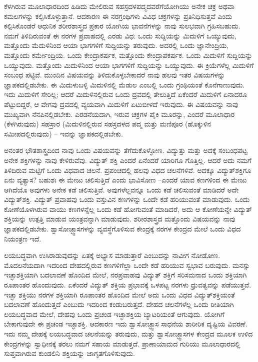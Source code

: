 ಕೆಳಗಿರುವ ಮೂಲಾಧಾರದಿಂದ ಹಿಡಿದು ಮೇಲಿರುವ ಸಹಸ್ರದಳಪದ್ಮದವರೆಗೆ\break ಯೋಗಿಯು ಅನೇಕ ಚಕ್ರ ಅಥವಾ ಕಮಲಗಳನ್ನು ಕಲ್ಪಿಸಿಕೊಳ್ಳುತ್ತಾನೆ. ಆದಕಾರಣ ಈ ನರಗ್ರಂಥಿಗಳು ವಿವಿಧ ಚಕ್ರಗಳನ್ನು ಪ್ರತಿನಿಧಿಸುತ್ತವೆ ಎಂದು ಕಲ್ಪಿಸಿಕೊಂಡರೆ ಆಧುನಿಕ ಶರೀರಶಾಸ್ತ್ರದ ಪ್ರಕಾರ ಯೋಗಿಯ ಭಾವನೆಗಳನ್ನು ನಾವು ಸುಲಭವಾಗಿ ಗ್ರಹಿಸಬಹುದು. ನಮಗೆ ತಿಳಿದಿರುವಂತೆ ಈ ನರಗಳ ಪ್ರವಾಹದಲ್ಲಿ ಎರಡು ವಿಧ: ಒಂದು ಸುದ್ದಿಯನ್ನು ಮಿದುಳಿಗೆ ಒಯ್ಯುವುದು, ಮತ್ತೊಂದು ಮೆದುಳಿನಿಂದ ಆಯಾ ಭಾಗಗಳಿಗೆ ಸುದ್ದಿಯನ್ನು ತರುವುದು. ಅದರಲ್ಲಿ ಒಂದು ಜ್ಞಾನೇಂದ್ರಿಯ, ಮತ್ತೊಂದು ಕರ್ಮೇಂದ್ರಿಯ. ಒಂದು ಕೇಂದ್ರಾಕರ್ಷಕ, ಮತ್ತೊಂದು ಕೇಂದ್ರಾಪಕರ್ಷಕ. ಒಂದು ಮಿದುಳಿಗೆ ಸುದ್ದಿಯನ್ನು ಒಯ್ಯುವುದು. ಮತ್ತೊಂದು ಮಿದುಳಿನಿಂದ ಆಯಾ ಭಾಗಗಳಿಗೆ ಸುದ್ದಿಯನ್ನು ಒಯ್ಯುವುದು. ಈ ಕ್ರಿಯೆಗಳೆಲ್ಲ ಮಿದುಳಿಗೆ ಸಂಬಂಧ ಪಟ್ಟಿವೆ. ಮುಂದಿನ ವಿಷಯವನ್ನು ತಿಳಿದುಕೊಳ್ಳಬೇಕಾದರೆ ನಾವು ಹಲವು ಇತರ ವಿಷಯಗಳನ್ನು ಜ್ಞಾಪಕದಲ್ಲಿಡಬೇಕು. ಈ ಮಿದುಳುಬಳ್ಳಿ ಮಿದುಳಿನಲ್ಲಿ ಮೆಡುಲ  ಎಂಬಲ್ಲಿ ಒಂದು ಗ್ರಂಥಿಯಂತೆ ಕೊನೆಗಾಣುವುದು. ಇದು ಮಿದುಳಿಗೆ ಸೇರಿಲ್ಲ; ಆದರೆ ಮಿದುಳಿನಲ್ಲಿರುವ ಒಂದು ದ್ರವದಲ್ಲಿ ತೇಲುತ್ತಿದೆ ಏಕೆಂದರೆ ಮಿದುಳಿಗೆ ಏನಾದರೂ ಪೆಟ್ಟುಬಿದ್ದರೆ, ಆ ವೇಗವು ದ್ರವದಲ್ಲಿ ವ್ಯಯವಾಗಿ ಮಿದುಳಿಗೆ ಏಟುಬೀಳದೆ ಇರುವುದು. ಈ ವಿಷಯವನ್ನು ನಾವು ಮುಖ್ಯವಾಗಿ ನೆನಪಿನಲ್ಲಿಡಬೇಕು. ಎರಡನೆಯದಾಗಿ, ಇರುವ ಚಕ್ರಗಳ ಪೈಕಿ ಮೂರನ್ನು, ಎಂದರೆ ಮೂಲಾಧಾರ (ಕೆಳಗಿರುವುದು) ಸಹಸ್ರಾರ (ಮಿದುಳಿನಲ್ಲಿರುವ ಸಹಸ್ರದಳದ ಪದ್ಮ ಮತ್ತು ಮಣಿಪೂರ (ಹೊಕ್ಕುಳಿನ ಸಮೀಪದಲ್ಲಿರುವುದು) – ಇವನ್ನು ಜ್ಞಾಪಕದಲ್ಲಿಡಬೇಕು. 



ಅನಂತರ ಭೌತಶಾಸ್ತ್ರದಿಂದ ನಾವು ಒಂದು ವಿಷಯವನ್ನು ತೆಗೆದುಕೊಳ್ಳೋಣ. ವಿದ್ಯುತ್ತು ಮತ್ತು ಅದಕ್ಕೆ ಸಂಬಂಧಪಟ್ಟ ಅನೇಕ ಶಕ್ತಿಗಳನ್ನು ನಾವು ಕೇಳಿರುವೆವು. ವಿದ್ಯುತ್​ ಶಕ್ತಿ ಎಂದರೆ ಏನೆಂದರೆ ಯಾರಿಗೂ ಗೊತ್ತಿಲ್ಲ. ಆದರೆ ಅದು ನಮಗೆ ತಿಳಿದಿರುವ ಮಟ್ಟಿಗೆ ಒಂದು ವಿಧವಾದ ಚಲನೆ. ಪ್ರಪಂಚದಲ್ಲಿ ಹಲವು ವಿಧದ ಚಲನೆಗಳಿವೆ. ಅದಕ್ಕೂ ವಿದ್ಯುತ್​ಶಕ್ತಿಗೂ ಏನು ವ್ಯತ್ಯಾಸ? ಬಹುಶಃ ಈ ಮೇಜು ಚಲಿಸುತ್ತಿದೆ ಎಂದು ಭಾವಿಸೋಣ –ಎಂದರೆ ಯಾವ ಕಣಗಳಿಂದ ಈ ಮೇಜು ಆಗಿದೆಯೊ ಅವುಗಳು ಅನೇಕ ಕಡೆ ಚಲಿಸುತ್ತಿವೆ. ಅವುಗಳೆಲ್ಲವನ್ನೂ ಒಂದು ಕಡೆ ಚಲಿಸುವಂತೆ ಮಾಡಿದರೆ ಅದೇ ವಿದ್ಯುತ್​ಶಕ್ತಿ. ವಿದ್ಯುತ್​ ಪ್ರವಾಹವು ಒಂದು ವಸ್ತುವಿನ ಕಣಗಳನ್ನು ಒಂದೇ ಕಡೆ ಹರಿಯುವಂತೆ ಮಾಡುವುದು. ಒಂದು ಕೋಣೆಯೊಳಗಿರುವ ವಾಯು ಕಣಗಳನ್ನೆಲ್ಲ ಒಂದು ಕಡೆ ಹೋಗುವಂತೆ ಮಾಡಿದರೆ, ಅದು ಆ ಕೋಣೆಯನ್ನೇ ವಿದ್ಯುತ್​ ಶಕ್ತಿಯನ್ನು ಉತ್ಪತ್ತಿ ಮಾಡುವ ಯಂತ್ರವನ್ನಾಗಿ ಮಾಡುವುದು. ಶರೀರಶಾಸ್ತ್ರದ ಮತ್ತೊಂದು ವಿಷಯವನ್ನು ನಾವು ಜ್ಞಾಪಕದಲ್ಲಿಡಬೇಕು. ಶ್ವಾಸೋಚ್ಛ್ವಾಸಗಳನ್ನು ವ್ಯವಸ್ಥೆಗೊಳಿಸುವ ಕೇಂದ್ರಕ್ಕೆ ನರಗಳ ಕೇಂದ್ರದ ಮೇಲೆ ಒಂದು ವಿಧದ ನಿಯಂತ್ರಣ ಇದೆ. 



ಲಯಬದ್ಧವಾಗಿ ಉಸಿರಾಡುವುದನ್ನು ಏತಕ್ಕೆ ಅಭ್ಯಾಸ ಮಾಡುತ್ತಾರೆ ಎಂಬುದನ್ನು ನಾವೀಗ ನೋಡೋಣ. ಮೊದಲನೆಯದಾಗಿ ಇದರಿಂದ ದೇಹದಲ್ಲಿರುವ ಕಣಗಳಿಗೆಲ್ಲಾ ಒಂದೇ ಕಡೆ ಹರಿಯುವ ಸ್ವಭಾವ ಬರುವುದು. ಮನಸ್ಸು ಇಚ್ಛಾಶಕ್ತಿಯಾಗಿ ಬದಲಾವಣೆ ಹೊಂದಿದ ಮೇಲೆ, ನರಪ್ರವಾಹವು ವಿದ್ಯುತ್​ ಶಕ್ತಿಗೆ ಸರಿಸಮನಾದ ಒಂದು ಶಕ್ತಿಯಾಗಿ ರೂಪಾಂತರ ಹೊಂದುವುದು. ಏಕೆಂದರೆ ವಿದ್ಯುತ್​ ಶಕ್ತಿಯ ಪ್ರಭಾವಕ್ಕೆ ಒಳಪಟ್ಟ ನರಗಳು ಧ್ರುವತ್ವವನ್ನು  ಪಡೆಯುತ್ತವೆ. ಇಚ್ಛಾ ಶಕ್ತಿಯು ನರಗಳ ಶಕ್ತಿಯಾಗಿ ರೂಪಾಂತರ ಹೊಂದಿದ ಮೇಲೆ ಅದು ಒಂದು ವಿಧದ ವಿದ್ಯುತ್​ ಶಕ್ತಿಯಂತೆ ಬದಲಾವಣೆ ಹೊಂದುತ್ತದೆ ಎಂಬುದು ಇದರಿಂದ ಕಂಡುಬರುತ್ತದೆ. ದೇಹದ ಚಲನೆಗಳೆಲ್ಲ ಒಂದು ರೀತಿಯಾಗಿ ಲಯಬದ್ಧವಾದ ಮೇಲೆ, ದೇಹವು ಒಂದು ಪ್ರಚಂಡ ಇಚ್ಛಾಶಕ್ತಿಯ ಬ್ಯಾಟರಿಯಂತೆ ಆಗುವುದು. ಯೋಗಿಗೆ ಬೇಕಾಗುವುದೇ ಈ ಪ್ರಚಂಡ ಇಚ್ಛಾಶಕ್ತಿ. ಆದಕಾರಣ ಇದು ಶ್ವಾಸೋಚ್ಛ್ವಾಸ ಸಾಧನೆಯ ಶಾರೀರಿಕ ದೃಷ್ಟಿಯ ವಿವರಣೆ. ಇದು ನಮ್ಮ ದೇಹಕ್ಕೆ ಲಯಬದ್ಧವಾದ ಚಲನೆಯನ್ನು ತರುವುದು, ಮತ್ತು ಶ್ವಾಸೋಚ್ಛ್ವಾಸಗಳ ಕೇಂದ್ರದ ಮೂಲಕ ಉಳಿದ ಕೇಂದ್ರಗಳನ್ನು ಸ್ವಾಧೀನಕ್ಕೆ ತರಲು ನಮಗೆ ಸಹಾಯ ಮಾಡುತ್ತದೆ. ಪ್ರಾಣಾಯಾಮದ ಗುರಿಯು ಮೂಲಾಧಾರದಲ್ಲಿ ಸುಪ್ತವಾಗಿರುವ ಕುಂಡಲಿನಿ ಶಕ್ತಿಯನ್ನು ಜಾಗೃತಗೊಳಿಸುವುದು. 



